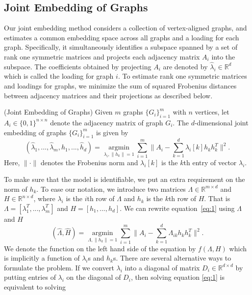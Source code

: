 \documentclass[10pt,journal,compsoc]{IEEEtran}
\newenvironment{definition}[1][Definition]{\begin{trivlist}
		\item[\hskip \labelsep {\bfseries #1}]}{\end{trivlist}}
\begin{document}
\subsection{Joint Embedding of Graphs}
Our joint embedding method considers a collection of vertex-aligned graphs, and estimates a common embedding space across all graphs and a loading for each graph. Specifically, it simultaneously identifies a subspace spanned by a set of rank one symmetric matrices and projects each adjacency matrix $A_i$ into the subspace. The coefficients obtained by projecting $A_i$ are denoted by $\hat{\lambda}_i \in \mathbb{R}^d$ which is called the loading for graph $i$. To estimate rank one symmetric matrices and loadings for graphs, we minimize the sum of squared Frobenius distances between adjacency matrices and their projections as described below.
\begin{definition} (Joint Embedding of Graphs) Given $m$  graphs $\{G_i \} _{i=1}^{m}$ with $n$ vertices, let $A_i \in \{0,1\}^{n \times n }$ denote  the adjacency matrix of graph $G_i$. The $d$-dimensional joint embedding of graphs $\{G_i \} _{i=1}^{m}$ is given by
\begin{equation}\label{eq:1}
 (\hat{\lambda}_1,...,\hat{\lambda}_m,\hat{h}_1,...,\hat{h}_d) = \underset{\lambda_i,\|h_k\|=1}{\operatorname{argmin}} \sum\limits_{i=1}^{m} \| A_i- \sum\limits_{k=1}^{d} \lambda_{i}[k] h_k h_k^T \|  ^2.  
\end{equation}
Here, $\| \cdot \|$ denotes the Frobenius norm and $\lambda_{i}[k]$ is the $k$th entry of vector $\lambda_i$.
\end{definition}
To make sure that the model is identifiable, we put an extra requirement on the norm of $h_k$. To ease our notation, we introduce two matrices $\Lambda \in \mathbb{R}^{m \times d}$ and $H\in \mathbb{R}^{n \times d}$, where $\lambda_i$ is the $i$th row of $\Lambda$ and $h_k$ is the $k$th row of $H$. That is $\Lambda=[\lambda_1^T,...,\lambda_m^T]$ and $H=[h_1,...,h_d]$. We can rewrite equation~\eqref{eq:1} using $\Lambda$ and $H$
\begin{equation*}
(\hat{\Lambda},\hat{H}) = \underset{\Lambda,\|h_k\|=1}{\operatorname{argmin}} \sum\limits_{i=1}^{m} \| A_i- \sum\limits_{k=1}^{d} \Lambda_{ik} h_k h_k^T \|  ^2.  
\end{equation*}
 We denote the function on the left hand side of the equation by $f(\Lambda,H)$ which is implicitly a function of $\lambda_i$s and $h_k$s. There are several alternative ways to formulate the problem. If we convert $\lambda_i$ into a diagonal of matrix $D_i \in \mathbb{R}^{d \times d}$ by putting entries of $\lambda_i$ on the diagonal of $D_i$, then solving equation \eqref{eq:1} is equivalent to solving
\end{document}
